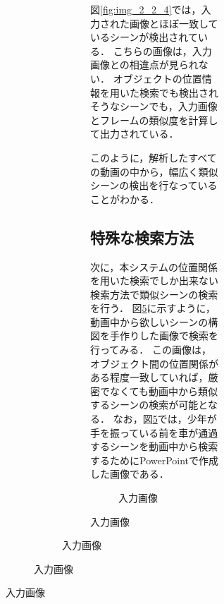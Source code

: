 \documentclass[a4j,12pt,dvipdfmx]{jreport}
\begin{document}
\begin{figure}[H]
\begin{figure}[H]
\begin{figure}[H]
\begin{figure}[H]
図\ref{fig:img_2_2_4}では，入力された画像とほぼ一致しているシーンが検出されている．
こちらの画像は，入力画像との相違点が見られない．
オブジェクトの位置情報を用いた検索でも検出されそうなシーンでも，入力画像とフレームの類似度を計算して出力されている．

このように，解析したすべての動画の中から，幅広く類似シーンの検出を行なっていることがわかる．

\subsection{特殊な検索方法}
次に，本システムの位置関係を用いた検索でしか出来ない検索方法で類似シーンの検索を行う．
図\ref{fig:img_2_3}に示すように，動画中から欲しいシーンの構図を手作りした画像で検索を行ってみる．
この画像は，オブジェクト間の位置関係がある程度一致していれば，厳密でなくても動画中から類似するシーンの検索が可能となる．
なお，図\ref{fig:img_2_3}では，少年が手を振っている前を車が通過するシーンを動画中から検索するためにPowerPointで作成した画像である．
\begin{figure}[H]
  \centering
  \caption{入力画像}
  \label{fig:img_2_3}
\end{figure}


\end{figure}
\end{figure}
\end{figure}
\end{figure}
\end{document}
